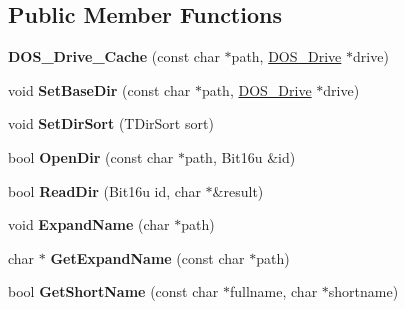 \subsection*{Public Member Functions}
\begin{DoxyCompactItemize}
\item 
\hypertarget{classDOS__Drive__Cache_a1d2b613312882771a0849446eff0e5f5}{{\bfseries D\-O\-S\-\_\-\-Drive\-\_\-\-Cache} (const char $\ast$path, \hyperlink{classDOS__Drive}{D\-O\-S\-\_\-\-Drive} $\ast$drive)}\label{classDOS__Drive__Cache_a1d2b613312882771a0849446eff0e5f5}

\item 
\hypertarget{classDOS__Drive__Cache_a8ed60a9683170b1c7eb36e31c31fa2bd}{void {\bfseries Set\-Base\-Dir} (const char $\ast$path, \hyperlink{classDOS__Drive}{D\-O\-S\-\_\-\-Drive} $\ast$drive)}\label{classDOS__Drive__Cache_a8ed60a9683170b1c7eb36e31c31fa2bd}

\item 
\hypertarget{classDOS__Drive__Cache_ac49b22a5b034eb6a9e029f2dce0f4773}{void {\bfseries Set\-Dir\-Sort} (T\-Dir\-Sort sort)}\label{classDOS__Drive__Cache_ac49b22a5b034eb6a9e029f2dce0f4773}

\item 
\hypertarget{classDOS__Drive__Cache_a85aec9a4d7d87913806fa98c96dd2b68}{bool {\bfseries Open\-Dir} (const char $\ast$path, Bit16u \&id)}\label{classDOS__Drive__Cache_a85aec9a4d7d87913806fa98c96dd2b68}

\item 
\hypertarget{classDOS__Drive__Cache_aa3d88abf30778f5cd2f50c17b461a9dc}{bool {\bfseries Read\-Dir} (Bit16u id, char $\ast$\&result)}\label{classDOS__Drive__Cache_aa3d88abf30778f5cd2f50c17b461a9dc}

\item 
\hypertarget{classDOS__Drive__Cache_a21a3d68ddb91cf0c8ef5aaa4dc088271}{void {\bfseries Expand\-Name} (char $\ast$path)}\label{classDOS__Drive__Cache_a21a3d68ddb91cf0c8ef5aaa4dc088271}

\item 
\hypertarget{classDOS__Drive__Cache_a35592522c14ab04cb0b4de854fc3dd0e}{char $\ast$ {\bfseries Get\-Expand\-Name} (const char $\ast$path)}\label{classDOS__Drive__Cache_a35592522c14ab04cb0b4de854fc3dd0e}

\item 
\hypertarget{classDOS__Drive__Cache_ae829119eadbb14de58f18339600e81ee}{bool {\bfseries Get\-Short\-Name} (const char $\ast$fullname, char $\ast$shortname)}\label{classDOS__Drive__Cache_ae829119eadbb14de58f18339600e81ee}


\end{DoxyCompactItemize}
